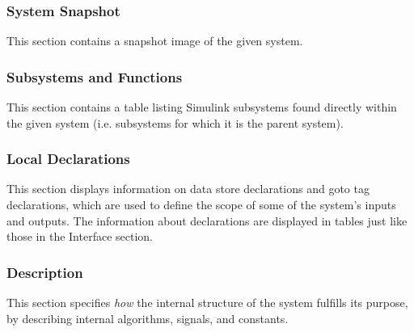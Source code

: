 \documentclass{mcscert}
\newcommand{\simulink}{Simulink}
\newcommand{\sigsubsnolink}{Significant Subsystems} %
\newcommand{\sigsubs}{\hyperref[def:sigsubs]{\sigsubsnolink{}}}
\begin{document}
	  \subsubsection{System Snapshot}
	  This section contains a snapshot image of the given system.
	  
	  \subsubsection{Subsystems and Functions}
	  This section contains a table listing \simulink{} subsystems found directly within the given system (i.e. subsystems for which it is the parent system).
          
      \subsubsection{Local Declarations}
      This section displays information on data store declarations and goto tag declarations, which are used to define the scope of some of the system's inputs and outputs. 
      The information about declarations are displayed in tables just like those in the Interface section.
          
      \subsubsection{Description} 
      \label{sssec:int-des-supp-description}
      This section specifies \emph{how} the internal structure of the system fulfills its purpose, by describing internal algorithms, signals, and constants. 
\end{document}
